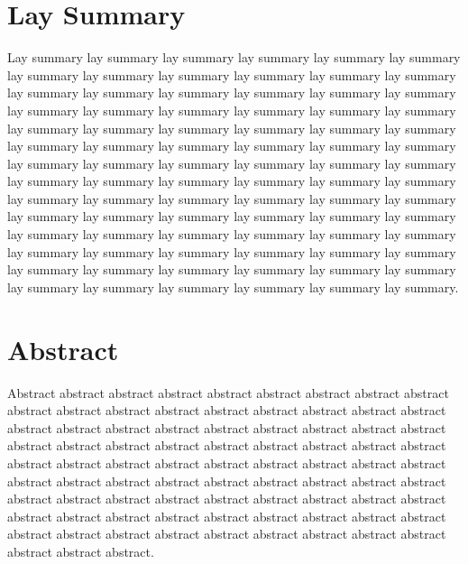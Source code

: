 \chapter*{Lay Summary}
\noindent
Lay summary lay summary lay summary lay summary lay summary lay summary lay summary lay summary lay summary lay summary lay summary lay summary lay summary lay summary lay summary lay summary lay summary lay summary lay summary lay summary lay summary lay summary lay summary lay summary lay summary lay summary lay summary lay summary lay summary lay summary lay summary lay summary lay summary lay summary lay summary lay summary lay summary lay summary lay summary lay summary lay summary lay summary lay summary lay summary lay summary lay summary lay summary lay summary lay summary lay summary lay summary lay summary lay summary lay summary lay summary lay summary lay summary lay summary lay summary lay summary lay summary lay summary lay summary lay summary lay summary lay summary lay summary lay summary lay summary lay summary lay summary lay summary lay summary lay summary lay summary lay summary lay summary lay summary lay summary lay summary lay summary lay summary lay summary lay summary.
\vspace{10mm}
\normalsize

\chapter*{Abstract}
\noindent
Abstract abstract abstract abstract abstract abstract abstract abstract abstract abstract abstract abstract abstract abstract abstract abstract abstract abstract abstract abstract abstract abstract abstract abstract abstract abstract abstract abstract abstract abstract abstract abstract abstract abstract abstract abstract abstract abstract abstract abstract abstract abstract abstract abstract abstract abstract abstract abstract abstract abstract abstract abstract abstract abstract abstract abstract abstract abstract abstract abstract abstract abstract abstract abstract abstract abstract abstract abstract abstract abstract abstract abstract abstract abstract abstract abstract abstract abstract abstract abstract abstract abstract abstract abstract.
\vspace{10mm}
\normalsize

